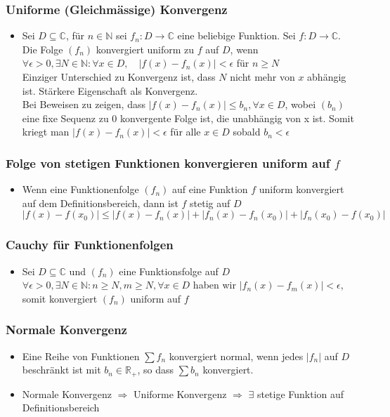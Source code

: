\documentclass[a3paper, 11pt, landscape]{scrartcl}
\begin{document}
\begin{multicols*}{3}
	\subsubsection{Uniforme (Gleichmässige) Konvergenz}
	\begin{itemize}
	    \item Sei $D \subseteq \mathbb{C}$, für $n\in\mathbb{N}$ sei $f_n:D\to\mathbb{C}$ eine beliebige Funktion. Sei $f:D\to\mathbb{C}$. \\
	    Die Folge $(f_n)$ konvergiert uniform zu $f$ auf $D$, wenn \\
	    $\forall \epsilon >0, \exists N \in \mathbb{N}:\forall x \in D, \quad | f(x)-f_n(x) | < \epsilon $ für $n \geq N$\\
	    Einziger Unterschied zu Konvergenz ist, dass $N$ nicht mehr von $x$ abhängig ist. Stärkere Eigenschaft als Konvergenz.\\
	    Bei Beweisen zu zeigen, dass $|f(x)-f_n(x)|\leq b_n, \forall x\in D$, wobei $(b_n)$ eine fixe Sequenz zu 0 konvergente Folge ist, die unabhängig von x ist. Somit kriegt man $|f(x)-f_n(x)| < \epsilon$ für alle $x\in D$ sobald $b_n < \epsilon$
	\end{itemize}
	
	\subsubsection{Folge von stetigen Funktionen konvergieren uniform auf $f$}
	\begin{itemize}
	    \item Wenn eine Funktionenfolge $(f_n)$ auf eine Funktion $f$ uniform konvergiert auf dem Definitionsbereich, dann ist $f$ stetig auf $D$\\
	    $|f(x) -f(x_0)|\leq |f(x)-f_n(x)|+|f_n(x)-f_n(x_0)|+|f_n(x_0)-f(x_0)|$
	\end{itemize}
	\subsubsection{Cauchy für Funktionenfolgen}
	\begin{itemize}
	    \item Sei $D\subseteq\mathbb{C}$ und $(f_n)$ eine Funktionsfolge auf $D$\\
	    $\forall \epsilon > 0, \exists N \in \mathbb{N}: n \geq N, m \geq N,\forall x \in D$ haben wir $|f_n(x)-f_m(x)|<\epsilon$, somit konvergiert $(f_n)$ uniform auf $f$
	\end{itemize}
	\subsubsection{Normale Konvergenz}
	\begin{itemize}
	    \item Eine Reihe von Funktionen $\sum f_n$ konvergiert normal, wenn jedes $|f_n|$ auf $D$ beschränkt ist mit $b_n\in\mathbb{R}_+$, so dass $\sum b_n$ konvergiert.
	    \item Normale Konvergenz $\Rightarrow$ Uniforme Konvergenz $\Rightarrow$ $\exists$ stetige Funktion auf Definitionsbereich
	\end{itemize}
	

\end{multicols*}
\end{document}
